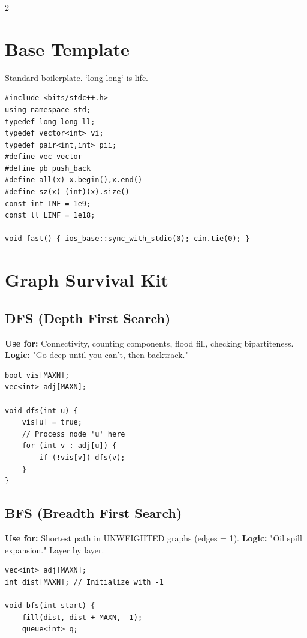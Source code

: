 \documentclass[10pt, letterpaper]{article}
\begin{document}
\begin{multicols}{2}

	\section{Base Template}
	Standard boilerplate. `long long` is life.
	\begin{lstlisting}
#include <bits/stdc++.h>
using namespace std;
typedef long long ll;
typedef vector<int> vi;
typedef pair<int,int> pii;
#define vec vector
#define pb push_back
#define all(x) x.begin(),x.end()
#define sz(x) (int)(x).size()
const int INF = 1e9;
const ll LINF = 1e18;

void fast() { ios_base::sync_with_stdio(0); cin.tie(0); }
\end{lstlisting}

	\section{Graph Survival Kit}

	\subsection{DFS (Depth First Search)}
	\textbf{Use for:} Connectivity, counting components, flood fill, checking bipartiteness.
	\textbf{Logic:} "Go deep until you can't, then backtrack."
	\begin{lstlisting}
bool vis[MAXN];
vec<int> adj[MAXN];

void dfs(int u) {
    vis[u] = true;
    // Process node 'u' here
    for (int v : adj[u]) {
        if (!vis[v]) dfs(v);
    }
}
\end{lstlisting}

	\subsection{BFS (Breadth First Search)}
	\textbf{Use for:} Shortest path in UNWEIGHTED graphs (edges = 1).
	\textbf{Logic:} "Oil spill expansion." Layer by layer.
	\begin{lstlisting}
vec<int> adj[MAXN];
int dist[MAXN]; // Initialize with -1

void bfs(int start) {
    fill(dist, dist + MAXN, -1);
    queue<int> q;


\end{lstlisting}
\end{multicols}
\end{document}
